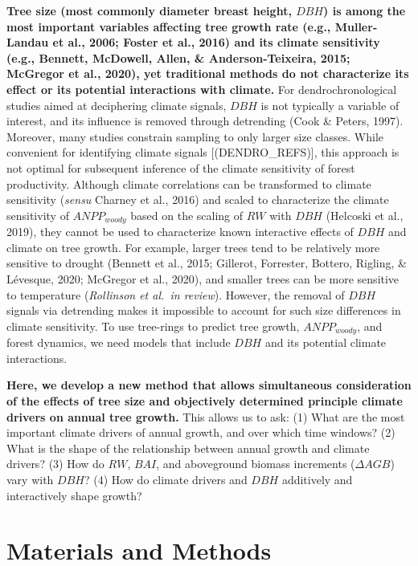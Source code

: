 \documentclass[
]{article}
\begin{document}
\textbf{Tree size (most commonly diameter breast height, \(DBH\)) is
among the most important variables affecting tree growth rate (e.g.,
Muller-Landau et al., 2006; Foster et al., 2016) and its climate
sensitivity (e.g., Bennett, McDowell, Allen, \& Anderson-Teixeira, 2015;
McGregor et al., 2020), yet traditional methods do not characterize its
effect or its potential interactions with climate.} For
dendrochronological studies aimed at deciphering climate signals,
\(DBH\) is not typically a variable of interest, and its influence is
removed through detrending (Cook \& Peters, 1997). Moreover, many
studies constrain sampling to only larger size classes. While convenient
for identifying climate signals {[}(DENDRO\_REFS){]}, this approach is
not optimal for subsequent inference of the climate sensitivity of
forest productivity. Although climate correlations can be transformed to
climate sensitivity (\emph{sensu} Charney et al., 2016) and scaled to
characterize the climate sensitivity of \(ANPP_{woody}\) based on the
scaling of \(RW\) with \(DBH\) (Helcoski et al., 2019), they cannot be
used to characterize known interactive effects of \(DBH\) and climate on
tree growth. For example, larger trees tend to be relatively more
sensitive to drought (Bennett et al., 2015; Gillerot, Forrester,
Bottero, Rigling, \& Lévesque, 2020; McGregor et al., 2020), and smaller
trees can be more sensitive to temperature (\emph{Rollinson et al.~in
review}). However, the removal of \(DBH\) signals via detrending makes
it impossible to account for such size differences in climate
sensitivity. To use tree-rings to predict tree growth, \(ANPP_{woody}\),
and forest dynamics, we need models that include \(DBH\) and its
potential climate interactions.

\textbf{Here, we develop a new method that allows simultaneous
consideration of the effects of tree size and objectively determined
principle climate drivers on annual tree growth.} This allows us to ask:
(1) What are the most important climate drivers of annual growth, and
over which time windows? (2) What is the shape of the relationship
between annual growth and climate drivers? (3) How do \(RW\), \(BAI\),
and aboveground biomass increments (\(\Delta AGB\)) vary with \(DBH\)?
(4) How do climate drivers and \(DBH\) additively and interactively
shape growth?

\hypertarget{materials-and-methods}{%
\section{Materials and Methods}\label{materials-and-methods}}
\end{document}
